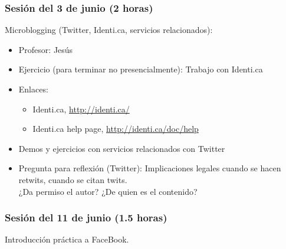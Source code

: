 \documentclass[a4paper,12pt]{article}
\begin{document}
\subsubsection{Sesión del 3 de junio (2 horas)}

Microblogging (Twitter, Identi.ca, servicios relacionados):

\begin{itemize}
\item Profesor: Jesús
\item Ejercicio (para terminar no presencialmente): Trabajo con Identi.ca
\item Enlaces:
  \begin{itemize}
  \item Identi.ca, \url{http://identi.ca/}
  \item Identi.ca help page, \url{http://identi.ca/doc/help}
  \end{itemize}
\item Demos y ejercicios con servicios relacionados con Twitter
\item Pregunta para reflexión (Twitter): Implicaciones legales cuando se hacen retwits, cuando se citan twits. \\
  ¿Da permiso el autor? ¿De quien es el contenido?
\end{itemize}

\subsubsection{Sesión del 11 de junio (1.5 horas)}

Introducción práctica a FaceBook.
\end{document}

